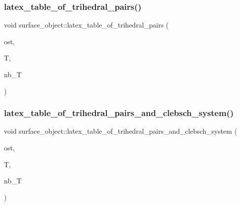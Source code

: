\subsubsection{\texorpdfstring{latex\+\_\+table\+\_\+of\+\_\+trihedral\+\_\+pairs()}{latex\_table\_of\_trihedral\_pairs()}}
{\footnotesize\ttfamily void surface\+\_\+object\+::latex\+\_\+table\+\_\+of\+\_\+trihedral\+\_\+pairs (\begin{DoxyParamCaption}\item[{ostream \&}]{ost,  }\item[{\mbox{\hyperlink{galois_8h_a09fddde158a3a20bd2dcadb609de11dc}{I\+NT}} $\ast$}]{T,  }\item[{\mbox{\hyperlink{galois_8h_a09fddde158a3a20bd2dcadb609de11dc}{I\+NT}}}]{nb\+\_\+T }\end{DoxyParamCaption})}

\mbox{\label{classsurface__object_a174ac7ffea380b2c2593fbe540da38c4}} 
\subsubsection{\texorpdfstring{latex\+\_\+table\+\_\+of\+\_\+trihedral\+\_\+pairs\+\_\+and\+\_\+clebsch\+\_\+system()}{latex\_table\_of\_trihedral\_pairs\_and\_clebsch\_system()}}
{\footnotesize\ttfamily void surface\+\_\+object\+::latex\+\_\+table\+\_\+of\+\_\+trihedral\+\_\+pairs\+\_\+and\+\_\+clebsch\+\_\+system (\begin{DoxyParamCaption}\item[{ostream \&}]{ost,  }\item[{\mbox{\hyperlink{galois_8h_a09fddde158a3a20bd2dcadb609de11dc}{I\+NT}} $\ast$}]{T,  }\item[{\mbox{\hyperlink{galois_8h_a09fddde158a3a20bd2dcadb609de11dc}{I\+NT}}}]{nb\+\_\+T }\end{DoxyParamCaption})}

\mbox{\label{classsurface__object_ae5f992f6e9c83b63306dbec1ce0ea7b9}} 
